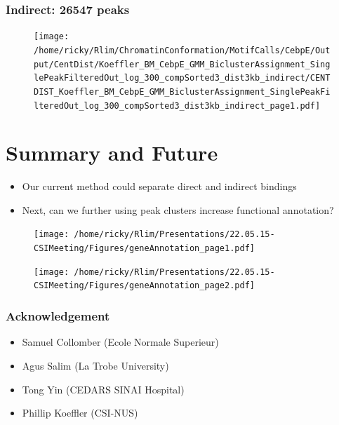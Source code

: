 \documentclass[notes]{beamer}
\begin{document}
\begin{frame}[plain]
    \frametitle{Indirect: 26547 peaks}
    \begin{figure}
        \texttt{[image: /home/ricky/Rlim/ChromatinConformation/MotifCalls/CebpE/Output/CentDist/Koeffler\_BM\_CebpE\_GMM\_BiclusterAssignment\_SinglePeakFilteredOut\_log\_300\_compSorted3\_dist3kb\_indirect/CENTDIST\_Koeffler\_BM\_CebpE\_GMM\_BiclusterAssignment\_SinglePeakFilteredOut\_log\_300\_compSorted3\_dist3kb\_indirect\_page1.pdf]}
    \end{figure}
\end{frame}

\section{Summary and Future}
    \begin{frame}
        \begin{itemize}[<+->]
            \item Our current method could separate direct and indirect bindings 
            \item Next, can we further using peak clusters increase functional annotation?
        \end{itemize}
    \end{frame} 

\begin{frame}[plain]
    \begin{figure}
        \texttt{[image: /home/ricky/Rlim/Presentations/22.05.15-CSIMeeting/Figures/geneAnnotation\_page1.pdf]}
    \end{figure}
\end{frame}

\begin{frame}[plain]
    \begin{figure}
        \texttt{[image: /home/ricky/Rlim/Presentations/22.05.15-CSIMeeting/Figures/geneAnnotation\_page2.pdf]}
    \end{figure}
\end{frame}

\begin{frame}
    \frametitle{Acknowledgement}
    \begin{itemize}
        \item Samuel Collomber (Ecole Normale Superieur)
        \item Agus Salim (La Trobe University)
        \item Tong Yin (CEDARS SINAI Hospital)
        \item Phillip Koeffler (CSI-NUS)
    \end{itemize}
\end{frame}
\end{document}
